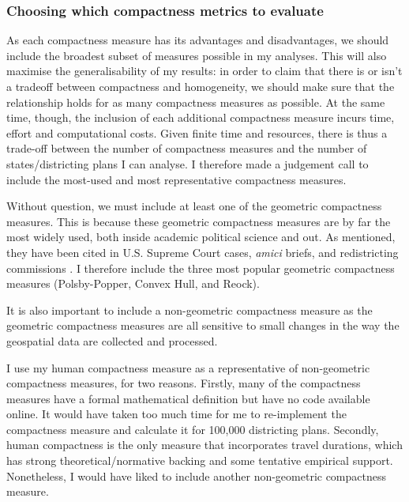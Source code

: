 \documentclass[]{article}
\begin{document}
\hypertarget{choosing-which-compactness-metrics-to-evaluate}{%
\subsubsection{Choosing which compactness metrics to
evaluate}\label{choosing-which-compactness-metrics-to-evaluate}}

As each compactness measure has its advantages and disadvantages, we
should include the broadest subset of measures possible in my analyses.
This will also maximise the generalisability of my results: in order to
claim that there is or isn't a tradeoff between compactness and
homogeneity, we should make sure that the relationship holds for as many
compactness measures as possible. At the same time, though, the
inclusion of each additional compactness measure incurs time, effort and
computational costs. Given finite time and resources, there is thus a
trade-off between the number of compactness measures and the number of
states/districting plans I can analyse. I therefore made a judgement
call to include the most-used and most representative compactness
measures.

Without question, we must include at least one of the geometric
compactness measures. This is because these geometric compactness
measures are by far the most widely used, both inside academic political
science and out. As mentioned, they have been cited in U.S. Supreme
Court cases, \emph{amici} briefs, and redistricting commissions
\citep{moncrief2011}. I therefore include the three most popular
geometric compactness measures (Polsby-Popper, Convex Hull, and Reock).

It is also important to include a non-geometric compactness measure as
the geometric compactness measures are all sensitive to small changes in
the way the geospatial data are collected and processed.

I use my human compactness measure as a representative of non-geometric
compactness measures, for two reasons. Firstly, many of the compactness
measures have a formal mathematical definition but have no code
available online. It would have taken too much time for me to
re-implement the compactness measure and calculate it for 100,000
districting plans. Secondly, human compactness is the only measure that
incorporates travel durations, which has strong theoretical/normative
backing and some tentative empirical support. Nonetheless, I would have
liked to include another non-geometric compactness measure.
\end{document}

